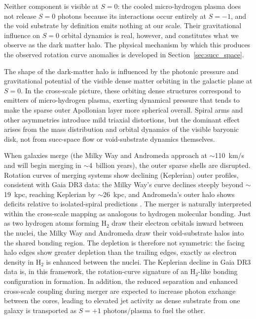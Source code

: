 \documentclass[11pt,letterpaper]{article}
\begin{document}
Neither component is visible at $S{=}0$: the cooled micro-hydrogen plasma does not
release $S{=}0$ photons because its interactions occur entirely at $S{=}{-1}$, and
the void substrate by definition emits nothing at our scale. Their gravitational
influence on $S{=}0$ orbital dynamics is real, however, and constitutes what we
observe as the dark matter halo. The physical mechanism by which this produces the
observed rotation curve anomalies is developed in Section~\ref{sec:succ_space}.

The shape of the dark-matter halo is influenced by the photonic pressure and
gravitational potential of the visible dense matter orbiting in the galactic plane
at $S{=}0$. In the cross-scale picture, these orbiting dense structures correspond
to emitters of micro-hydrogen plasma, exerting dynamical pressure
that tends to make the sparse outer Apollonian layer more spherical overall. Spiral
arms and other asymmetries introduce mild triaxial distortions, but the dominant
effect arises from the mass distribution and orbital dynamics of the visible
baryonic disk, not from succ-space flow or void-substrate dynamics themselves.

When galaxies merge (the Milky Way and Andromeda approach at $\sim$110~km/s and
will begin merging in $\sim$4~billion years), the outer sparse shells are disrupted.
Rotation curves of merging systems show declining (Keplerian) outer profiles,
consistent with Gaia DR3 data: the Milky Way's curve declines steeply beyond
$\sim$19~kpc, reaching Keplerian by $\sim$26~kpc, and Andromeda's outer halo shows
deficits relative to isolated-spiral predictions \cite{Jiao2023}.
The merger is naturally interpreted within the cross-scale mapping as analogous to
hydrogen molecular bonding. Just as two hydrogen atoms forming H$_2$ draw their
electron orbitals inward between the nuclei, the Milky Way and Andromeda draw their
void-substrate halos into the shared bonding region. The depletion is therefore not
symmetric: the facing halo edges show greater depletion than the trailing edges,
exactly as electron density in H$_2$ is enhanced between the nuclei. The Keplerian
decline in Gaia DR3 data is, in this framework, the rotation-curve signature of an
H$_2$-like bonding configuration in formation.
In addition, the reduced separation and enhanced cross-scale coupling during merger
are expected to increase photon exchange between the cores, leading to elevated jet
activity as dense substrate from one galaxy is transported as $S{=}+1$ photons/plasma
to fuel the other.
\end{document}
